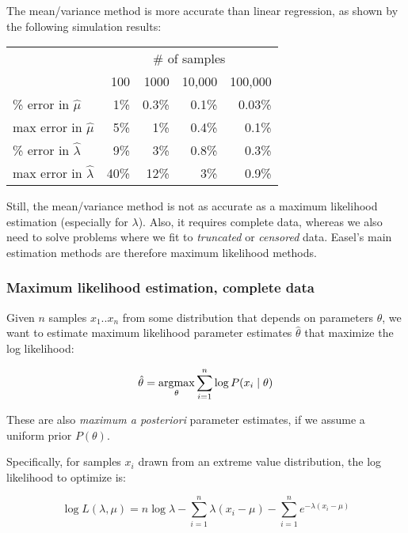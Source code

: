 The mean/variance method is more accurate than linear regression, as
shown by the following simulation results:

\begin{center}
\begin{tabular}{lrrrr} \hline
                              & \multicolumn{4}{c}{\# of samples}\\
                              & 100 & 1000  & 10,000 & 100,000 \\
\% error in $\hat{\mu}$       &  1\%& 0.3\% &  0.1\% & 0.03\%  \\
max error in $\hat{\mu}$      &  5\%&   1\% &  0.4\% &  0.1\%  \\
\% error in $\hat{\lambda}$   &  9\%&   3\% &  0.8\% &  0.3\%  \\
max error in $\hat{\lambda}$  & 40\%&  12\% &    3\% &  0.9\%  \\ \hline
\end{tabular}
\end{center}

Still, the mean/variance method is not as accurate as a maximum
likelihood estimation (especially for $\lambda$). Also, it requires
complete data, whereas we also need to solve problems where we fit to
\emph{truncated} or \emph{censored} data. Easel's main estimation
methods are therefore maximum likelihood methods.

\subsubsection{Maximum likelihood estimation, complete data}

Given $n$ samples $x_1..x_n$ from some distribution that depends on
parameters $\theta$, we want to estimate maximum likelihood parameter
estimates $\hat{\theta}$ that maximize the log likelihood:

\[
   \hat{\theta} = \mathop{\mathrm{argmax}}\limits_{\theta} \sum_{i=1}^{n} \log P(x_i \mid \theta)
\]

These are also \emph{maximum a posteriori} parameter estimates, if we
assume a uniform prior $P(\theta)$.

Specifically, for samples $x_i$ drawn from an extreme value
distribution, the log likelihood to optimize is:

\begin{equation}
\log L(\lambda, \mu) = n \log \lambda - \sum_{i=1}^{n} \lambda(x_i -
\mu) - \sum_{i=1}^{n} e^{-\lambda(x_i - \mu)}
\label{eqn:gumbel_logL}
\end{equation}

